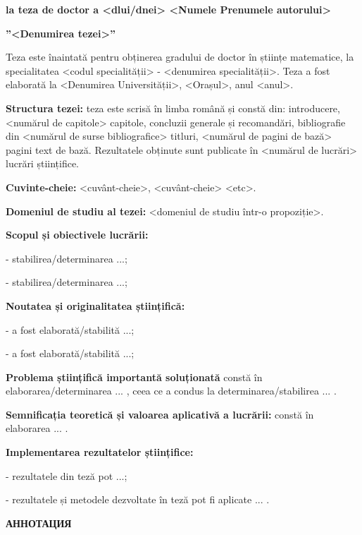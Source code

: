 \documentclass[a4paper, 12pt]{report}
\renewcommand{\baselinestretch}{1.5}
\begin{document}
{\renewcommand{\baselinestretch}{1.17}
\selectfont

\centerline
{\bf la teza de doctor a <dlui/dnei> <Numele Prenumele autorului>}

\centerline
{\bf ''<Denumirea tezei>''}

\vspace*{4mm}

Teza este înaintată pentru obținerea gradului de doctor în științe matematice, 
la specialitatea <codul specialității> - <denumirea specialității>. 
Teza a fost elaborată la <Denumirea Universității>, <Orașul>, anul <anul>.

{\bf Structura tezei:} teza este scrisă în limba română și 
constă din: introducere, <numărul de capitole>
capitole, concluzii generale și recomandări, bibliografie din <numărul de surse bibliografice> titluri, <numărul de pagini de bază> pagini text de bază. Rezultatele obținute sunt publicate în <numărul de lucrări> lucrări științifice.

{\bf Cuvinte-cheie:} <cuvânt-cheie>, <cuvânt-cheie> <etc>.

{\bf Domeniul de studiu al tezei:} <domeniul de studiu într-o propoziție>.

{\bf Scopul și obiectivele lucrării:} 

- stabilirea/determinarea ...;

- stabilirea/determinarea ...;

{\bf Noutatea și originalitatea științifică:} 

- a fost elaborată/stabilită ...;

- a fost elaborată/stabilită ...;

{\bf Problema științifică importantă soluționată} constă în elaborarea/determinarea ... , ceea ce a condus la determinarea/stabilirea ... .

{\bf Semnificația teoretică și valoarea aplicativă a lucrării:} constă în elaborarea ... .

{\bf Implementarea rezultatelor științifice:} 

- rezultatele din teză pot ...;

- rezultatele și metodele dezvoltate în teză pot fi aplicate ... .

}

\newpage

\newpage


\centerline{{\bf АННОТАЦИЯ}}
\end{document}
